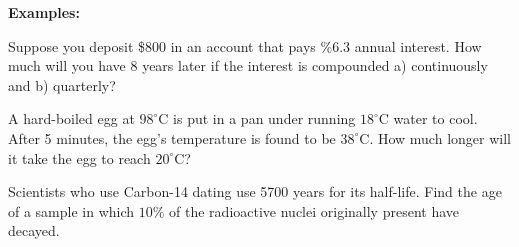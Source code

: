 \vspace{1in}

\textbf{Examples:}
\begin{questions}
    \question Suppose you deposit \$800 in an account that pays \%6.3 annual interest. How much will you have 8 years later if the interest is compounded a) continuously and b) quarterly?
    
    \question A hard-boiled egg at $98^\circ$C is put in a pan under running $18^\circ$C water to cool. After 5 minutes, the egg's temperature is found to be $38^\circ$C. How much longer will it take the egg to reach $20^\circ$C?
    
    \question Scientists who use Carbon-14 dating use 5700 years for its half-life. Find the age of a sample in which $10\%$ of the radioactive nuclei originally present have decayed.
\end{questions}

\newpage
